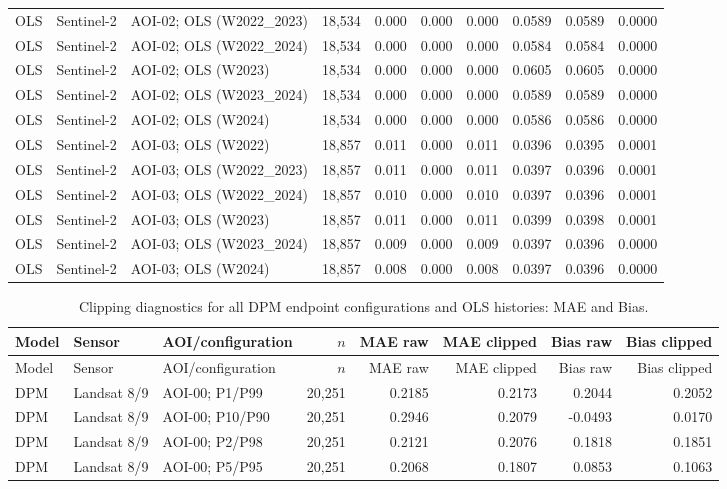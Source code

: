 \begin{landscape}
\begin{longtable}{lllrrrrrrr}
OLS & Sentinel-2 & AOI-02; OLS (W2022\_2023) & 18,534 & 0.000 & 0.000 & 0.000 & 0.0589 & 0.0589 & 0.0000 \\
OLS & Sentinel-2 & AOI-02; OLS (W2022\_2024) & 18,534 & 0.000 & 0.000 & 0.000 & 0.0584 & 0.0584 & 0.0000 \\
OLS & Sentinel-2 & AOI-02; OLS (W2023) & 18,534 & 0.000 & 0.000 & 0.000 & 0.0605 & 0.0605 & 0.0000 \\
OLS & Sentinel-2 & AOI-02; OLS (W2023\_2024) & 18,534 & 0.000 & 0.000 & 0.000 & 0.0589 & 0.0589 & 0.0000 \\
OLS & Sentinel-2 & AOI-02; OLS (W2024) & 18,534 & 0.000 & 0.000 & 0.000 & 0.0586 & 0.0586 & 0.0000 \\
OLS & Sentinel-2 & AOI-03; OLS (W2022) & 18,857 & 0.011 & 0.000 & 0.011 & 0.0396 & 0.0395 & 0.0001 \\
OLS & Sentinel-2 & AOI-03; OLS (W2022\_2023) & 18,857 & 0.011 & 0.000 & 0.011 & 0.0397 & 0.0396 & 0.0001 \\
OLS & Sentinel-2 & AOI-03; OLS (W2022\_2024) & 18,857 & 0.010 & 0.000 & 0.010 & 0.0397 & 0.0396 & 0.0001 \\
OLS & Sentinel-2 & AOI-03; OLS (W2023) & 18,857 & 0.011 & 0.000 & 0.011 & 0.0399 & 0.0398 & 0.0001 \\
OLS & Sentinel-2 & AOI-03; OLS (W2023\_2024) & 18,857 & 0.009 & 0.000 & 0.009 & 0.0397 & 0.0396 & 0.0000 \\
OLS & Sentinel-2 & AOI-03; OLS (W2024) & 18,857 & 0.008 & 0.000 & 0.008 & 0.0397 & 0.0396 & 0.0000 \\
\bottomrule\end{longtable}
\clearpage
\begin{longtable}{lllrrrrr}
\caption{Clipping diagnostics for all DPM endpoint configurations and OLS histories: MAE and Bias.}\\
\toprule Model & Sensor & AOI/configuration & $n$ & MAE raw & MAE clipped & Bias raw & Bias clipped \\ \midrule
\endfirsthead
\toprule Model & Sensor & AOI/configuration & $n$ & MAE raw & MAE clipped & Bias raw & Bias clipped \\ \midrule
\endhead
DPM & Landsat 8/9 & AOI-00; P1/P99 & 20,251 & 0.2185 & 0.2173 & 0.2044 & 0.2052 \\
DPM & Landsat 8/9 & AOI-00; P10/P90 & 20,251 & 0.2946 & 0.2079 & -0.0493 & 0.0170 \\
DPM & Landsat 8/9 & AOI-00; P2/P98 & 20,251 & 0.2121 & 0.2076 & 0.1818 & 0.1851 \\
DPM & Landsat 8/9 & AOI-00; P5/P95 & 20,251 & 0.2068 & 0.1807 & 0.0853 & 0.1063 \\

\end{longtable}
\end{landscape}
